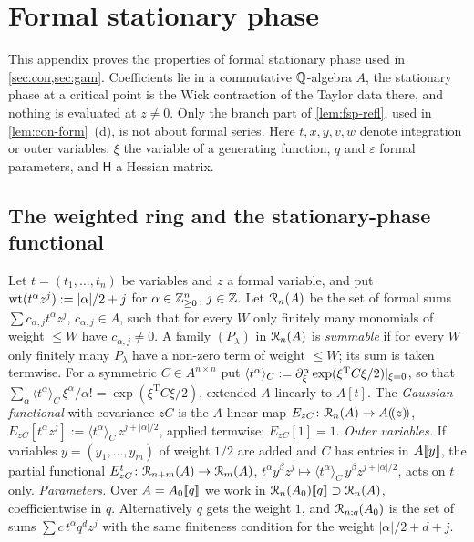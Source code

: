 \section{Formal stationary phase}
\label{sec:fsp}

This appendix proves the properties of formal stationary phase used in \cref{sec:con,sec:gam}. Coefficients lie in a commutative $\mathbb{Q}$-algebra $A$, the stationary phase at a critical point is the Wick contraction of the Taylor data there, and nothing is evaluated at $z\neq0$. Only the branch part of \cref{lem:fsp-refl}, used in \cref{lem:con-form}~(d), is not about formal series. Here $t,x,y,v,w$ denote integration or outer variables, $\xi$ the variable of a generating function, $q$ and $\varepsilon$ formal parameters, and $\mathsf H$ a Hessian matrix.

\subsection{The weighted ring and the stationary-phase functional}
\label{sec:fsp-def}

\begin{defn}
\label{def:fsp-ring}
Let $t=(t_1,\dots,t_n)$ be variables and $z$ a formal variable, and put $\operatorname{wt}(t^\alpha z^j):=|\alpha|/2+j$ for $\alpha\in\mathbb{Z}_{\geq0}^n$, $j\in\mathbb{Z}$. Let $\mathcal{R}_n(A)$ be the set of formal sums $\sum c_{\alpha,j}t^\alpha z^j$, $c_{\alpha,j}\in A$, such that for every $W$ only finitely many monomials of weight $\leq W$ have $c_{\alpha,j}\neq0$. A family $(P_\lambda)$ in $\mathcal{R}_n(A)$ is \emph{summable} if for every $W$ only finitely many $P_\lambda$ have a non-zero term of weight $\leq W$; its sum is taken termwise. For a symmetric $C\in A^{n\times n}$ put $\langle t^\alpha\rangle_C:=\partial_\xi^\alpha\exp(\xi^{\mathrm T}C\xi/2)|_{\xi=0}$, so that $\sum_\alpha\langle t^\alpha\rangle_C\,\xi^\alpha/\alpha!=\exp(\xi^{\mathrm T}C\xi/2)$, extended $A$-linearly to $A[t]$. The \emph{Gaussian functional} with covariance $zC$ is the $A$-linear map $E_{zC}\colon\mathcal{R}_n(A)\to A(\!(z)\!)$, $E_{zC}[t^\alpha z^j]:=\langle t^\alpha\rangle_C\,z^{j+|\alpha|/2}$, applied termwise; $E_{zC}[1]=1$.
\emph{Outer variables.} If variables $y=(y_1,\dots,y_m)$ of weight $1/2$ are added and $C$ has entries in $A[\![ y ]\!]$, the partial functional $E^t_{zC}\colon\mathcal{R}_{n+m}(A)\to\mathcal{R}_m(A)$, $t^\alpha y^\beta z^j\mapsto\langle t^\alpha\rangle_C\,y^\beta z^{j+|\alpha|/2}$, acts on $t$ only.
\emph{Parameters.} Over $A=A_0[\![ q ]\!]$ we work in $\mathcal{R}_n(A_0)[\![ q ]\!]\supset\mathcal{R}_n(A)$, coefficientwise in $q$. Alternatively $q$ gets the weight $1$, and $\mathcal{R}_{n;q}(A_0)$ is the set of sums $\sum c\,t^\alpha q^dz^j$ with the same finiteness condition for the weight $|\alpha|/2+d+j$.
\end{defn}

